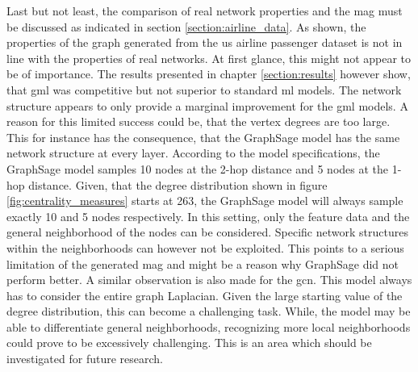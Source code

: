   \noindent Last but not least, the comparison of real network properties and
  the \acs{mag} must be discussed as indicated in section 
  \ref{section:airline_data}. As shown, the properties of the graph generated from the 
  \acs{us} airline passenger dataset is not in line with the properties of 
  real networks. At first glance, this might not appear to be of importance. 
  The results presented in chapter \ref{section:results} however show, that \acs{gml} 
  was competitive but not superior to standard \acs{ml} models. The network 
  structure appears to only provide a marginal improvement for the \acs{gml} 
  models. A reason for this limited success could be, that the vertex degrees 
  are too large. This for instance has the consequence, that the GraphSage 
  model has the same network structure at every layer. According to the model 
  specifications, the GraphSage model samples 10 nodes at the 2-hop distance 
  and 5 nodes at the 1-hop distance. Given, that the degree distribution shown 
  in figure \ref{fig:centrality_measures} starts at 263, the GraphSage model will 
  always sample exactly 10 and 5 nodes respectively. In this setting, only the 
  feature data and the general neighborhood of the nodes can be considered. 
  Specific network structures within the neighborhoods can however not be 
  exploited. This points to a serious limitation of the generated \acs{mag} and 
  might be a reason why GraphSage did not perform better. A similar observation 
  is also made for the \acs{gcn}. This model always has to consider the entire 
  graph Laplacian. Given the large starting value of the degree
  distribution, this can become a challenging task. While, the model may be
  able to differentiate general neighborhoods, recognizing more local
  neighborhoods could prove to be excessively challenging. This is an area which
  should be investigated for future research.






